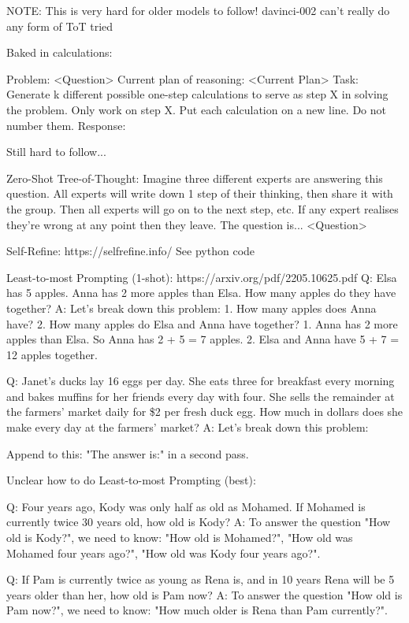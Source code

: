 \documentclass[11pt]{article}
\begin{document}
NOTE: This is very hard for older models to follow! davinci-002 can't really do any form of ToT tried

Baked in calculations:

Problem:
<Question> 
Current plan of reasoning:
<Current Plan>
Task:
Generate {k} different possible one-step calculations to serve as step {X} in solving the problem. Only work on step {X}. Put each calculation on a new line. Do not number them.
Response:

Still hard to follow...

Zero-Shot Tree-of-Thought:
Imagine three different experts are answering this question.
All experts will write down 1 step of their thinking,
then share it with the group.
Then all experts will go on to the next step, etc.
If any expert realises they're wrong at any point then they leave.
The question is...
<Question>

Self-Refine: https://selfrefine.info/
See python code

Least-to-most Prompting (1-shot): https://arxiv.org/pdf/2205.10625.pdf
Q: Elsa has 5 apples. Anna has 2 more apples than Elsa. How many apples do they have together?
A: Let's break down this problem: 1. How many apples does Anna have? 2. How many apples do Elsa and Anna have together?
1. Anna has 2 more apples than Elsa. So Anna has 2 + 5 = 7 apples.
2. Elsa and Anna have 5 + 7 = 12 apples together.

Q: Janet's ducks lay 16 eggs per day. She eats three for breakfast every morning and bakes muffins for her friends every day with four. She sells the remainder at the farmers' market daily for \$2 per fresh duck egg. How much in dollars does she make every day at the farmers' market?
A: Let's break down this problem:

Append to this: "The answer is:" in a second pass.

Unclear how to do Least-to-most Prompting (best):

Q: Four years ago, Kody was only half as old as Mohamed. If Mohamed is currently twice 30 years
old, how old is Kody?
A: To answer the question "How old is Kody?", we need to know: "How old is Mohamed?", "How
old was Mohamed four years ago?", "How old was Kody four years ago?".

Q: If Pam is currently twice as young as Rena is, and in 10 years Rena will be 5 years older
than her, how old is Pam now?
A: To answer the question "How old is Pam now?", we need to know: "How much older is Rena
than Pam currently?".
\end{document}
